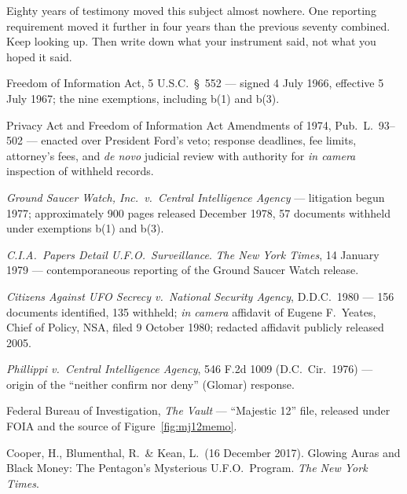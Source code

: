 
Eighty years of testimony moved this subject almost nowhere. One reporting requirement moved it further
in four years than the previous seventy combined. Keep looking up. Then write down what your instrument
said, not what you hoped it said.

\vspace{14pt}

\begin{srcnotes}
\item Freedom of Information Act, 5 U.S.C.\ \S~552 --- signed 4 July 1966, effective 5 July 1967; the
nine exemptions, including b(1) and b(3).
\item Privacy Act and Freedom of Information Act Amendments of 1974, Pub.\ L.\ 93--502 --- enacted over
President Ford's veto; response deadlines, fee limits, attorney's fees, and \emph{de novo} judicial
review with authority for \emph{in camera} inspection of withheld records.
\item \emph{Ground Saucer Watch, Inc.\ v.\ Central Intelligence Agency} --- litigation begun 1977;
approximately 900 pages released December 1978, 57 documents withheld under exemptions b(1) and b(3).
\item \emph{C.I.A.\ Papers Detail U.F.O.\ Surveillance}. \emph{The New York Times}, 14 January 1979 ---
contemporaneous reporting of the Ground Saucer Watch release.
\item \emph{Citizens Against UFO Secrecy v.\ National Security Agency}, D.D.C.\ 1980 --- 156 documents
identified, 135 withheld; \emph{in camera} affidavit of Eugene F.\ Yeates, Chief of Policy, NSA,
filed 9 October 1980; redacted affidavit publicly released 2005.
\item \emph{Phillippi v.\ Central Intelligence Agency}, 546 F.2d 1009 (D.C.\ Cir.\ 1976) --- origin of
the ``neither confirm nor deny'' (Glomar) response.
\item Federal Bureau of Investigation, \emph{The Vault} --- ``Majestic 12'' file, released under FOIA
and the source of Figure~\ref{fig:mj12memo}. 
\item Cooper, H., Blumenthal, R.\ \& Kean, L.\ (16 December 2017). Glowing Auras and Black Money: The
Pentagon's Mysterious U.F.O.\ Program. \emph{The New York Times}.

\end{srcnotes}

